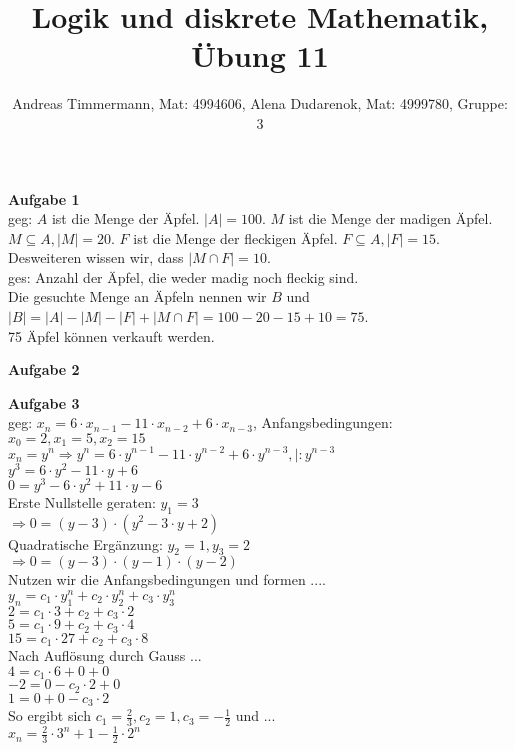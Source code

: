 \documentclass[a4paper]{scrartcl}
\title{Logik und diskrete Mathematik, Übung 11}
\author{Andreas Timmermann, Mat: 4994606, Alena Dudarenok, Mat: 4999780, Gruppe: 3}
\begin{document}
	\maketitle
	\begin{flushleft}
		\textbf{Aufgabe 1}\\
		geg: $A$ ist die Menge der Äpfel. $|A|=100$. $M$ ist die Menge der madigen Äpfel. $M\subseteq A, |M|=20$.  $F$ ist die Menge der fleckigen Äpfel. $F\subseteq A, |F|=15$. Desweiteren wissen wir, dass $|M\cap F|=10$.\\
		ges: Anzahl der Äpfel, die weder madig noch fleckig sind.\\[1em]
		Die gesuchte Menge an Äpfeln nennen wir $B$ und $|B|=|A|-|M|-|F|+|M\cap F| = 100-20-15+10=75$.\\
		75 Äpfel können verkauft werden.\\[1em]
	\end{flushleft}
	\begin{flushleft}
		\textbf{Aufgabe 2}\\
	\end{flushleft}
	\begin{flushleft}
		\textbf{Aufgabe 3}\\
		geg: $x_n=6\cdot x_{n-1}-11\cdot x_{n-2}+ 6\cdot x_{n-3}$, Anfangsbedingungen: $x_0=2, x_1=5, x_2=15$\\[1em]
		$x_n=y^n \Rightarrow y^n=6\cdot y^{n-1}-11\cdot y^{n-2}+6\cdot y^{n-3}, |:y^{n-3}$\\
		$y^3=6\cdot y^2-11\cdot y+6$\\
		$0 = y^3-6\cdot y^2+11\cdot y-6$\\
		Erste Nullstelle geraten: $y_1=3$\\
		$\Rightarrow 0=(y-3)\cdot(y^2-3\cdot y+2)$\\
		Quadratische Ergänzung: $y_2=1, y_3=2$\\
		$\Rightarrow 0=(y-3)\cdot(y-1)\cdot(y-2)$\\
		Nutzen wir die Anfangsbedingungen und formen ....\\
		$y_n=c_1\cdot y_1^n+c_2\cdot y_2^n+c_3\cdot y_3^n$\\
		$2=c_1\cdot 3+c_2+c_3\cdot 2$\\
		$5=c_1\cdot 9+c_2+c_3\cdot 4$\\
		$15=c_1\cdot 27+c_2+c_3\cdot 8$\\
		Nach Auflösung durch Gauss ...\\
		$4=c_1\cdot 6+0+0$\\
		$-2=0-c_2\cdot 2+0$\\
		$1=0+0-c_3\cdot 2$\\
		So ergibt sich $c_1=\frac{2}{3}, c_2=1, c_3=-\frac{1}{2}$ und ...\\
		$x_n=\frac{2}{3}\cdot 3^n+1-\frac{1}{2}\cdot 2^n$\\
	\end{flushleft}
\end{document}
